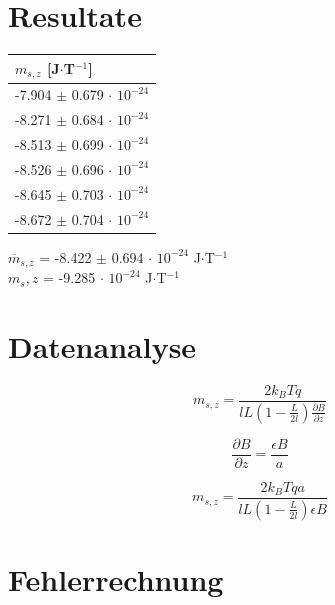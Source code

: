 \documentclass[a4paper,parskip,11pt, DIV12]{scrreprt}
\begin{document}
\clearpage

\chapter{Resultate}

\begin{table}[H]
\centering
\renewcommand{\arraystretch}{1.2} %
\setlength{\tabcolsep}{3mm} %
\begin{tabular}{l}
$m_{s,z}$ [J$\cdot$T$^{-1}$] \\ \hline
-7.904 $\pm$ 0.679 $\cdot$ $10^{-24}$\\
-8.271 $\pm$ 0.684 $\cdot$ $10^{-24}$\\
-8.513 $\pm$ 0.699 $\cdot$ $10^{-24}$\\
-8.526 $\pm$ 0.696 $\cdot$ $10^{-24}$\\
-8.645 $\pm$ 0.703 $\cdot$ $10^{-24}$\\
-8.672 $\pm$ 0.704 $\cdot$ $10^{-24}$\\
\end{tabular}
\end{table} 

$\overline{m}_{s,z}$ = -8.422 $\pm$ 0.694 $\cdot$ $10^{-24}$ J$\cdot$T$^{-1}$\\
$m_s,z$ = -9.285 $\cdot$ $10^{-24}$ J$\cdot$T$^{-1}$   \footnotesize{ \cite{https://en.wikipedia.org} }


\clearpage


\chapter{Datenanalyse}
\begin{equation}
m_{s,z}=\frac{2k_BTq}{lL(1-\frac{L}{2l})\frac{\partial B}{\partial z}}
\end{equation}

\begin{equation}
\frac{\partial B}{\partial z}=\frac{\epsilon B}{a}
\end{equation}

\begin{equation}
m_{s,z}=\frac{2k_BTqa}{lL(1-\frac{L}{2l})\epsilon B}
\end{equation}


\clearpage

\chapter{Fehlerrechnung}
\end{document}
